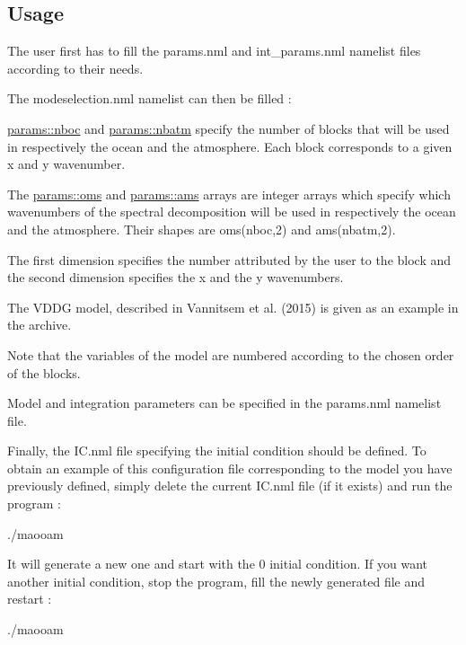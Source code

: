 \subsection*{Usage}

The user first has to fill the params.\-nml and int\-\_\-params.\-nml namelist files according to their needs.

The modeselection.\-nml namelist can then be filled \-:
\begin{DoxyItemize}
\item \hyperlink{classparams_a54123b5a947703d21d0c882dec6780ac}{params\-::nboc} and \hyperlink{classparams_aa5dc201b0a59d8bb25a5dc52d2ed3cac}{params\-::nbatm} specify the number of blocks that will be used in respectively the ocean and the atmosphere. Each block corresponds to a given x and y wavenumber.
\item The \hyperlink{classparams_a5e25e072992d5908eea5308243b7ec63}{params\-::oms} and \hyperlink{classparams_aa95299f1a9c54693b85e049004369089}{params\-::ams} arrays are integer arrays which specify which wavenumbers of the spectral decomposition will be used in respectively the ocean and the atmosphere. Their shapes are oms(nboc,2) and ams(nbatm,2).
\item The first dimension specifies the number attributed by the user to the block and the second dimension specifies the x and the y wavenumbers.
\item The V\-D\-D\-G model, described in Vannitsem et al. (2015) is given as an example in the archive.
\item Note that the variables of the model are numbered according to the chosen order of the blocks.
\end{DoxyItemize}

Model and integration parameters can be specified in the params.\-nml namelist file.

Finally, the I\-C.\-nml file specifying the initial condition should be defined. To obtain an example of this configuration file corresponding to the model you have previously defined, simply delete the current I\-C.\-nml file (if it exists) and run the program \-: \begin{DoxyVerb}./maooam
\end{DoxyVerb}


It will generate a new one and start with the 0 initial condition. If you want another initial condition, stop the program, fill the newly generated file and restart \-: \begin{DoxyVerb}./maooam
\end{DoxyVerb}



